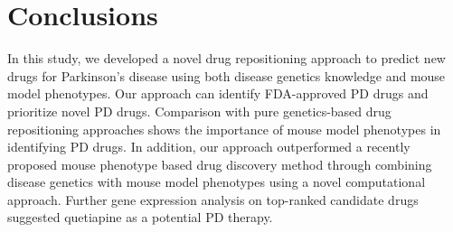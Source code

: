 \section{Conclusions}
  In this study, we developed a novel drug repositioning approach to predict new drugs for Parkinson's disease using both disease genetics knowledge and mouse model phenotypes. Our approach can identify FDA-approved PD drugs and prioritize novel PD drugs. Comparison with pure genetics-based drug repositioning approaches shows the importance of mouse model phenotypes in identifying PD drugs. In addition, our approach outperformed a recently proposed mouse phenotype based drug discovery method through combining disease genetics with mouse model phenotypes using a novel computational approach. Further gene expression analysis on top-ranked candidate drugs suggested quetiapine as a potential PD therapy.

